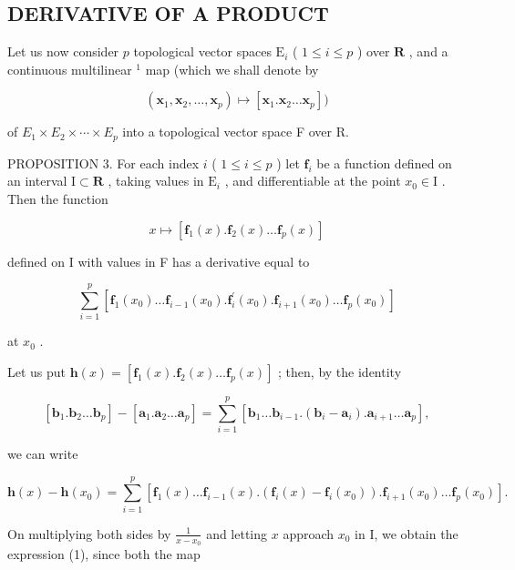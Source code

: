 \subsection{DERIVATIVE OF A PRODUCT}

Let us now consider \(p\) topological vector spaces \(\mathrm{E}_i\) ( \(1 \leqslant i \leqslant p\) ) over \(\mathbf{R}\) , and a continuous multilinear \(^1\) map (which we shall denote by

\[
\left(\mathbf {x} _ {1}, \mathbf {x} _ {2}, \dots , \mathbf {x} _ {p}\right) \mapsto \left[ \mathbf {x} _ {1}. \mathbf {x} _ {2} \dots \mathbf {x} _ {p} \right])
\]

of \(E_{1} \times E_{2} \times \cdots \times E_{p}\) into a topological vector space F over R.

PROPOSITION 3. For each index \(i\) ( \(1 \leqslant i \leqslant p\) ) let \(\mathbf{f}_i\) be a function defined on an interval \(\mathrm{I} \subset \mathbf{R}\) , taking values in \(\mathrm{E}_i\) , and differentiable at the point \(x_0 \in \mathrm{I}\) . Then the function

\[
x \mapsto [ \mathbf {f} _ {1} (x). \mathbf {f} _ {2} (x) \dots \mathbf {f} _ {p} (x) ]
\]

defined on I with values in F has a derivative equal to

\[
\sum_ {i = 1} ^ {p} \left[ \mathbf {f} _ {1} (x _ {0}) \dots \mathbf {f} _ {i - 1} (x _ {0}). \mathbf {f} _ {i} ^ {\prime} (x _ {0}). \mathbf {f} _ {i + 1} (x _ {0}) \dots \mathbf {f} _ {p} (x _ {0}) \right]\tag{1}
\]

at \(x_0\) .

Let us put \(\mathbf{h}(x) = [\mathbf{f}_1(x).\mathbf{f}_2(x)\dots \mathbf{f}_p(x)]\) ; then, by the identity

\[
\left[ \mathbf {b} _ {1}. \mathbf {b} _ {2} \dots \mathbf {b} _ {p} \right] - \left[ \mathbf {a} _ {1}. \mathbf {a} _ {2} \dots \mathbf {a} _ {p} \right] = \sum_ {i = 1} ^ {p} \left[ \mathbf {b} _ {1} \dots \mathbf {b} _ {i - 1}. (\mathbf {b} _ {i} - \mathbf {a} _ {i}). \mathbf {a} _ {i + 1} \dots \mathbf {a} _ {p} \right],
\]

we can write

\[
\mathbf {h} (x) - \mathbf {h} (x _ {0}) = \sum_ {i = 1} ^ {p} \left[ \mathbf {f} _ {1} (x) \dots \mathbf {f} _ {i - 1} (x). (\mathbf {f} _ {i} (x) - \mathbf {f} _ {i} (x _ {0})). \mathbf {f} _ {i + 1} (x _ {0}) \dots \mathbf {f} _ {p} (x _ {0}) \right].
\]

On multiplying both sides by \(\frac{1}{x - x_0}\) and letting \(x\) approach \(x_0\) in I, we obtain the expression (1), since both the map

